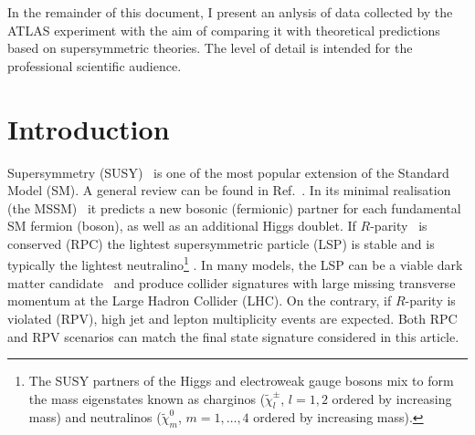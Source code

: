 \documentclass{outhesis}
\begin{document}
In the remainder of this document, I present an anlysis of data collected by the ATLAS experiment with the aim of comparing it with theoretical predictions 
based on supersymmetric theories. The level of detail is intended for the professional scientific audience. 


\section{Introduction}
\label{sec:intro}

Supersymmetry (SUSY)~\cite{Golfand:1971iw,Volkov:1973ix,Wess:1974tw,Wess:1974jb,Ferrara:1974pu,Salam:1974ig} is one of the most popular extension
of the Standard Model (SM). A general review can be found in Ref.~\cite{Martin:1997ns}. In its minimal realisation 
(the MSSM)~\cite{Fayet:1976et,Fayet:1977yc} it predicts a new bosonic (fermionic) partner for each fundamental SM fermion (boson), 
as well as an additional Higgs doublet. If $R$-parity~\cite{Farrar:1978xj} is conserved (RPC) the lightest supersymmetric particle (LSP) is 
stable and is typically the lightest neutralino\footnote{The SUSY partners of the Higgs and electroweak gauge bosons mix to form
the mass eigenstates known as charginos ($\tilde{\chi}^{\pm}_{l}$, $l = 1, 2$ ordered by increasing mass) and neutralinos 
($\tilde{\chi}^{0}_{m}$, $m = 1, \ldots, 4$ ordered by increasing mass).} \ninoone. In many models, the LSP can be a viable dark 
matter candidate~\cite{Goldberg:1983nd,Ellis:1983ew} and produce collider signatures with large missing transverse momentum at the Large Hadron 
Collider (LHC). On the contrary, if $R$-parity is violated (RPV), high jet and lepton multiplicity events are expected. 
Both RPC and RPV scenarios can match the final state signature considered in this article.
\end{document}
